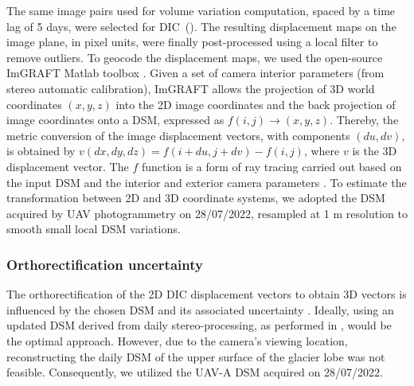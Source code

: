 The same image pairs used for volume variation computation, spaced by a time lag of 5 days, were selected for DIC~().
The resulting displacement maps on the image plane, in pixel units, were finally post-processed using a local filter to remove outliers.
To geocode the displacement maps, we used the open-source ImGRAFT Matlab toolbox \citep{Messerli2015}.
Given a set of camera interior parameters (from stereo automatic calibration), ImGRAFT allows the projection of 3D world coordinates \((x,y,z)\) into the 2D image coordinates and the back projection of image coordinates onto a DSM, expressed as \(f(i,j) \to (x,y,z)\). Thereby, the metric conversion of the image displacement vectors, with components \((du,dv)\), is obtained by \(v(dx,dy,dz) = f(i+du,j+dv)-f(i,j)\), where \(v\) is the 3D displacement vector. The \(f\) function is a form of ray tracing carried out based on the input DSM and the interior and exterior camera parameters \citep{Messerli2015}.
To estimate the transformation between 2D and 3D coordinate systems, we adopted the DSM acquired by UAV photogrammetry on 28/07/2022, resampled at 1 m resolution to smooth small local DSM variations.


\subsubsection{Orthorectification uncertainty}
\label{sec:4:orthorectification_uncertainty}

The orthorectification of the 2D DIC displacement vectors to obtain 3D vectors is influenced by the chosen DSM and its associated uncertainty \citep{Travelletti2012}.
Ideally, using an updated DSM derived from daily stereo-processing, as performed in \citet{Marsy2020}, would be the optimal approach.
However, due to the camera's viewing location, reconstructing the daily DSM of the upper surface of the glacier lobe was not feasible. 
Consequently, we utilized the UAV-A DSM acquired on 28/07/2022.

